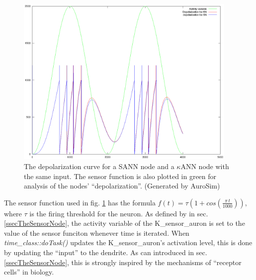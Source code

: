 \begin{figure}[hbtp!]
	\centering
		\includegraphics[width=0.95\textwidth]{eps_Comparison_between_the_two_sensors__depol.eps}
	\caption{The depolarization curve for a SANN node and a $\kappa$ANN node with the same input. The sensor function is also plotted in green for analysis of the nodes' ``depolarization''. %
	(Generated by AuroSim)}
	\label{figComparisonBetweenSsensorAndKsensorDepolCurve}
\end{figure}

The sensor function used in fig. \ref{figComparisonBetweenSsensorAndKsensorDepolCurve} has the formula \mbox{$f(t) = \tau (1 + cos( \frac{\pi \, t}{1000} ))$}, where $\tau$ is the firing threshold for the neuron. 
As defined by in sec. \ref{ssecTheSensorNode}, the activity variable of the K\_sensor\_auron is set to the value of the sensor funciton whenever time is iterated. %
When \emph{time\_class::doTask()} updates the K\_sensor\_auron's activation level, this is done by updating the ``input'' to the dendrite.
As can introduced in sec. \ref{ssecTheSensorNode}, this is strongly inspired by the mechanisms of ``receptor cells'' in biology. %







